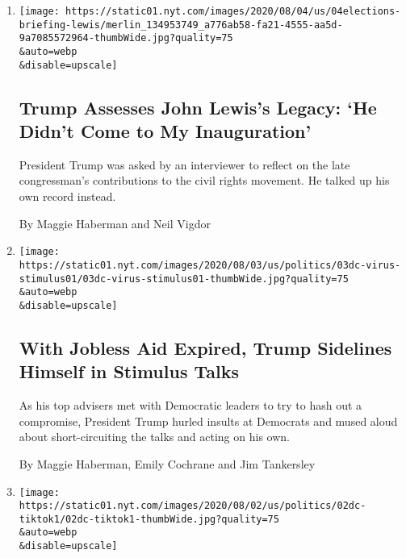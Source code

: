 \begin{enumerate}
\def\labelenumi{\arabic{enumi}.}
\item
  \href{/2020/08/04/us/politics/trump-john-lewis-axios.html}{}

  \texttt{[image: https://static01.nyt.com/images/2020/08/04/us/04elections-briefing-lewis/merlin\_134953749\_a776ab58-fa21-4555-aa5d-9a7085572964-thumbWide.jpg?quality=75\\\&auto=webp\\\&disable=upscale]}

  \hypertarget{trump-assesses-john-lewiss-legacy-he-didnt-come-to-my-inauguration}{%
  \subsection{Trump Assesses John Lewis's Legacy: `He Didn't Come to My
  Inauguration'}\label{trump-assesses-john-lewiss-legacy-he-didnt-come-to-my-inauguration}}

  President Trump was asked by an interviewer to reflect on the late
  congressman's contributions to the civil rights movement. He talked up
  his own record instead.

  By Maggie Haberman and Neil Vigdor
\item
  \href{/2020/08/03/us/politics/congress-jobless-aid-talks-trump.html}{}

  \texttt{[image: https://static01.nyt.com/images/2020/08/03/us/politics/03dc-virus-stimulus01/03dc-virus-stimulus01-thumbWide.jpg?quality=75\\\&auto=webp\\\&disable=upscale]}

  \hypertarget{with-jobless-aid-expired-trump-sidelines-himself-in-stimulus-talks}{%
  \subsection{With Jobless Aid Expired, Trump Sidelines Himself in
  Stimulus
  Talks}\label{with-jobless-aid-expired-trump-sidelines-himself-in-stimulus-talks}}

  As his top advisers met with Democratic leaders to try to hash out a
  compromise, President Trump hurled insults at Democrats and mused
  aloud about short-circuiting the talks and acting on his own.

  By Maggie Haberman, Emily Cochrane and Jim Tankersley
\item
  \href{/2020/08/02/business/economy/trump-tiktok-china-national-security.html}{}

  \texttt{[image: https://static01.nyt.com/images/2020/08/02/us/politics/02dc-tiktok1/02dc-tiktok1-thumbWide.jpg?quality=75\\\&auto=webp\\\&disable=upscale]}


\end{enumerate}
